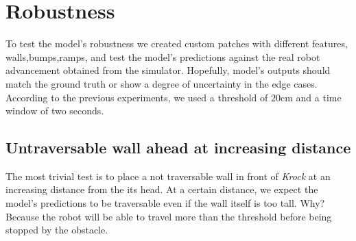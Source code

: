 \section{Robustness}
\label{sec: robustness}
To test the model's robustness we created custom patches with different features, walls,bumps,ramps, and test the model's predictions against the real robot advancement obtained from the simulator. Hopefully, model's outputs should match the ground truth or show a degree of uncertainty in the edge cases. According to the previous experiments, we used a threshold of $20$cm and a time window of two seconds. 
\subsection{Untraversable wall ahead at increasing distance}
The most trivial test is to place a not traversable wall in front of \emph{Krock} at an increasing distance from the its head. At a certain distance, we expect the model's predictions to be traversable even if the wall itself is too tall. Why? Because the robot will be able to travel more than the threshold before being stopped by the obstacle.

